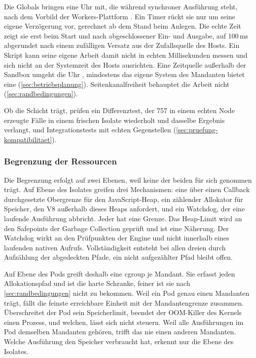 Die Globals bringen eine Uhr mit, die während synchroner Ausführung steht, nach dem Vorbild
der Workers-Plattform \autocite{cloudflare_security_2026}. Ein Timer rückt sie nur um seine eigene Verzögerung vor, gerechnet
ab dem Stand beim Anlegen. Die echte Zeit zeigt sie erst beim Start und nach abgeschlossener Ein- und Ausgabe, auf 100\,ms
abgerundet nach einem zufälligen Versatz aus der Zufallsquelle des Hosts. Ein Skript kann seine eigene Arbeit damit nicht in
echten Millisekunden messen und sich nicht an der Systemzeit des Hosts ausrichten. Eine Zeitquelle außerhalb der Sandbox umgeht die Uhr \autocite[S.~1]{schwarzl_remote-timer-as--service_2026}, mindestens das eigene System des Mandanten bietet eine
(\autoref{sec:betriebsplanung}). Seitenkanalfreiheit behauptet die Arbeit nicht (\autoref{sec:randbedingungen}).

Ob die Schicht trägt, prüfen ein Differenztest, der 757 in einem echten Node erzeugte Fälle in einem frischen Isolate
wiederholt und dasselbe Ergebnis verlangt, und Integrationstests mit echten Gegenstellen
(\autoref{sec:pruefung-kompatibilitaet}).

\subsubsection{Begrenzung der Ressourcen}
\label{sec:ressourcenbegrenzung}

Die Begrenzung erfolgt auf zwei Ebenen, weil keine der beiden für sich genommen trägt. Auf Ebene des Isolates greifen
drei Mechanismen: eine über einen Callback durchgesetzte Obergrenze für den JavaScript-Heap, ein zählender Allokator
für Speicher, den V8 außerhalb dieses Heaps anfordert, und ein Watchdog, der eine laufende Ausführung abbricht. Jeder
hat eine Grenze. Das Heap-Limit wird an den Safepoints der Garbage Collection geprüft und ist eine Näherung. Der
Watchdog wirkt an den Prüfpunkten der Engine und nicht innerhalb eines laufenden nativen Aufrufs. Vollständigkeit
entsteht bei allen dreien durch Aufzählung der abgedeckten Pfade, ein nicht aufgezählter Pfad bleibt offen.

Auf Ebene des Pods greift deshalb eine cgroup je Mandant. Sie erfasst jeden Allokationspfad und ist die harte
Schranke, feiner ist sie nach \autoref{sec:randbedingungen} nicht zu bekommen. Weil ein Pod genau einen Mandanten
trägt, fällt die feinste erreichbare Einheit mit der Mandantengrenze zusammen. Überschreitet der Pod sein
Speicherlimit, beendet der \ac{OOM}-Killer des Kernels einen Prozess, und welchen, lässt sich nicht steuern. Weil alle
Ausführungen im Pod demselben Mandanten gehören, trifft das nie einen anderen Mandanten. Welche Ausführung den
Speicher verbraucht hat, erkennt nur die Ebene des Isolates.

